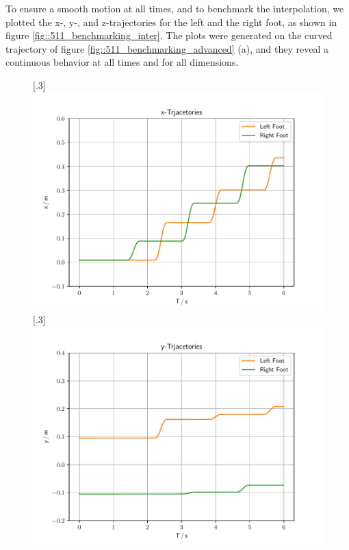 To ensure a smooth motion at all times, and to benchmark the interpolation, we plotted the x-, y-, and z-trajectories for the left and the right foot, as shown in figure \ref{fig::511_benchmarking_inter}. The plots were generated on the curved trajectory of figure \ref{fig::511_benchmarking_advanced} (a), and they reveal a continuous behavior at all times and for all dimensions.
\begin{figure}[h!]
	\centering
	[.3\linewidth]{\includegraphics[scale=.3]{chapters/05_experiments/01_user_controlled_walking/01_benchmarking/interpolated_x_trajectories.pdf}}
	[.3\linewidth]{\includegraphics[scale=.3]{chapters/05_experiments/01_user_controlled_walking/01_benchmarking/interpolated_y_trajectories.pdf}}

\end{figure}
